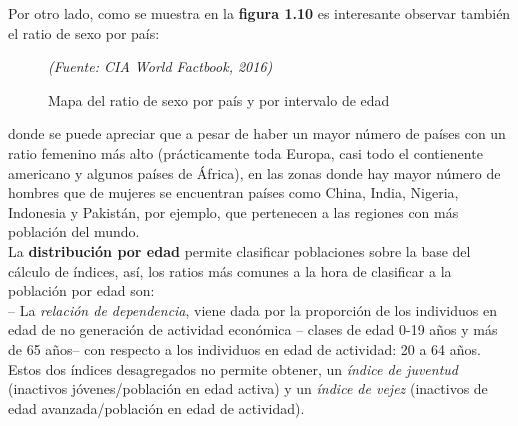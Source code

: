 \vspace{-0.8cm}
\noindent Por otro lado, como se muestra en la \textbf{figura 1.10} es interesante observar tambi\'en el ratio de sexo por pa\'is:\\

\vspace{-0.6cm}
\begin{figure}[!ht]
\hspace*{-0.3cm}
\vspace{-0.2cm}
\caption{Mapa del ratio de sexo por pa\'is y por intervalo de edad}
\centering\textit{\small{(Fuente: CIA World Factbook, 2016)}}
\end{figure}

\vspace{-0.4cm}
\noindent donde se puede apreciar que a pesar de haber un mayor n\'umero de pa\'ises con un ratio femenino m\'as alto (pr\'acticamente toda Europa, casi todo el contienente americano y algunos pa\'ises de \'Africa), en las zonas donde hay mayor n\'umero de hombres que de mujeres se encuentran pa\'ises como China, India, Nigeria, Indonesia y Pakist\'an, por ejemplo, que pertenecen a las regiones con m\'as poblaci\'on del mundo.\\

La \textbf{distribuci\'on por edad} permite clasificar poblaciones sobre la base del c\'alculo de \'indices, as\'i, los ratios m\'as comunes a la hora de clasificar a la poblaci\'on por edad son: \\
\indent-- La \textit{relaci\'on de dependencia}, viene dada por la proporci\'on de los individuos en edad de no generaci\'on de actividad econ\'omica -- clases de edad 0-19 a\~nos y m\'as de 65 a\~nos-- con respecto a los individuos en edad de actividad: 20 a 64 a\~nos. Estos dos \'indices desagregados no permite obtener, un \textit{\'indice de juventud} (inactivos j\'ovenes/poblaci\'on en edad activa) y un \textit{\'indice de vejez} (inactivos de edad avanzada/poblaci\'on en edad de actividad).\\

